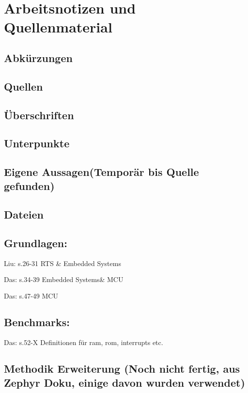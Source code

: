 
\chapter{Arbeitsnotizen und Quellenmaterial}
\label{ch:notizen}

\section{Abkürzungen}

\section{Quellen}

\section{Überschriften}

\section{Unterpunkte}

\section{Eigene Aussagen(Temporär bis Quelle gefunden)}

\section{Dateien}

\section{Grundlagen:}

Liu: s.26-31 RTS \& Embedded Systems

Das: s.34-39 Embedded Systems\& MCU

Das: s.47-49 MCU

\section{Benchmarks:}

Das: s.52-X Definitionen für ram, rom, interrupts etc.

\section{Methodik Erweiterung (Noch nicht fertig, aus Zephyr Doku, einige davon wurden verwendet)}

